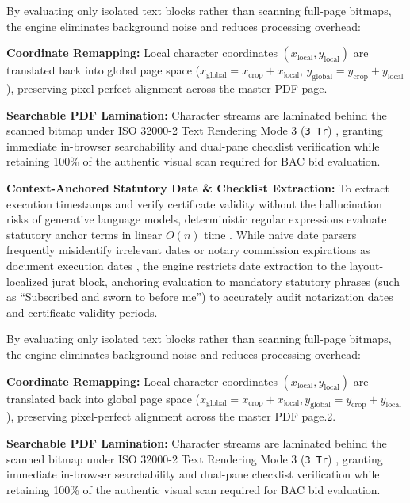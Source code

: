 By evaluating only isolated text blocks rather than scanning full-page bitmaps, the engine eliminates background noise and reduces processing overhead:

\textbf{Coordinate Remapping:} Local character coordinates $(x_{\mathrm{local}}, y_{\mathrm{local}})$ are translated back into global page space ($x_{\mathrm{global}} = x_{\mathrm{crop}} + x_{\mathrm{local}}$, $y_{\mathrm{global}} = y_{\mathrm{crop}} + y_{\mathrm{local}}$), preserving pixel-perfect alignment across the master PDF page.

\textbf{Searchable PDF Lamination:} Character streams are laminated behind the scanned bitmap under ISO 32000-2 Text Rendering Mode 3 (\texttt{3 Tr}) \cite{ref13,ref18}, granting immediate in-browser searchability and dual-pane checklist verification while retaining 100\% of the authentic visual scan required for BAC bid evaluation.

\textbf{Context-Anchored Statutory Date \& Checklist Extraction:} To extract execution timestamps and verify certificate validity without the hallucination risks of generative language models, deterministic regular expressions evaluate statutory anchor terms in linear $O(n)$ time \cite{ref25,ref26}. While naive date parsers frequently misidentify irrelevant dates or notary commission expirations as document execution dates \cite{docxb2}, the engine restricts date extraction to the layout-localized jurat block, anchoring evaluation to mandatory statutory phrases (such as ``Subscribed and sworn to before me'') to accurately audit notarization dates and certificate validity periods.

By evaluating only isolated text blocks rather than scanning full-page bitmaps, the engine eliminates background noise and reduces processing overhead:

\textbf{Coordinate Remapping:} Local character coordinates $(x_{\mathrm{local}},y_{\mathrm{local}})$ are translated back into global page space ($x_{\mathrm{global}}=x_{\mathrm{crop}}+x_{\mathrm{local}},y_{\mathrm{global}}=y_{\mathrm{crop}}+y_{\mathrm{local}}$), preserving pixel-perfect alignment across the master PDF page.2.

\textbf{Searchable PDF Lamination:} Character streams are laminated behind the scanned bitmap under ISO 32000-2 Text Rendering Mode 3 (\texttt{3 Tr}) \cite{ref13,ref18}, granting immediate in-browser searchability and dual-pane checklist verification while retaining 100\% of the authentic visual scan required for BAC bid evaluation.

